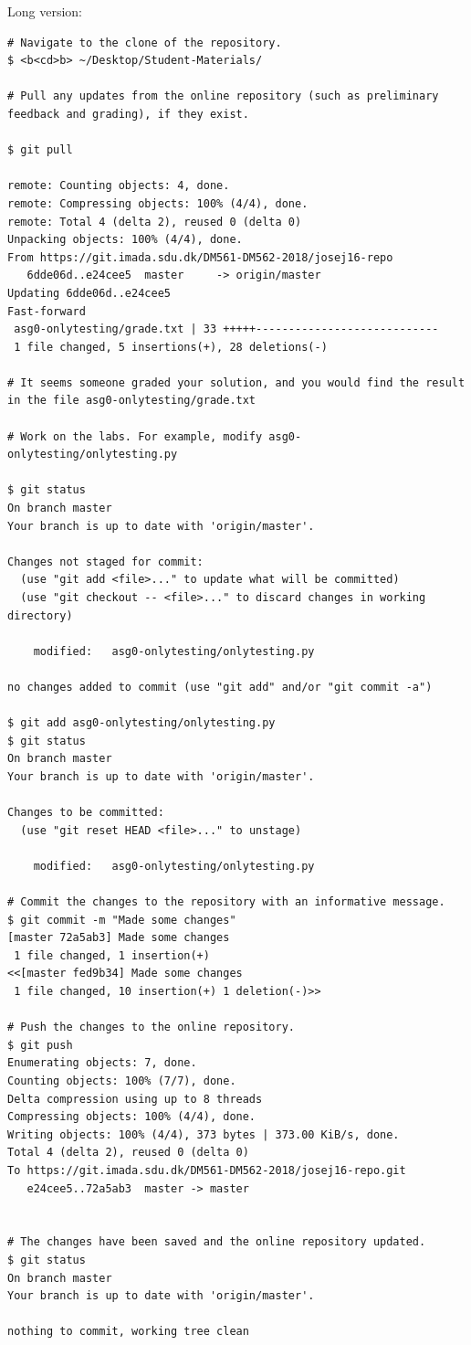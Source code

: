 Long version:
\begin{lstlisting}
# Navigate to the clone of the repository.
$ <b<cd>b> ~/Desktop/Student-Materials/

# Pull any updates from the online repository (such as preliminary feedback and grading), if they exist.

$ git pull

remote: Counting objects: 4, done.
remote: Compressing objects: 100% (4/4), done.
remote: Total 4 (delta 2), reused 0 (delta 0)
Unpacking objects: 100% (4/4), done.
From https://git.imada.sdu.dk/DM561-DM562-2018/josej16-repo
   6dde06d..e24cee5  master     -> origin/master
Updating 6dde06d..e24cee5
Fast-forward
 asg0-onlytesting/grade.txt | 33 +++++----------------------------
 1 file changed, 5 insertions(+), 28 deletions(-)

# It seems someone graded your solution, and you would find the result in the file asg0-onlytesting/grade.txt
 
# Work on the labs. For example, modify asg0-onlytesting/onlytesting.py

$ git status
On branch master
Your branch is up to date with 'origin/master'.

Changes not staged for commit:
  (use "git add <file>..." to update what will be committed)
  (use "git checkout -- <file>..." to discard changes in working directory)

	modified:   asg0-onlytesting/onlytesting.py

no changes added to commit (use "git add" and/or "git commit -a")

$ git add asg0-onlytesting/onlytesting.py
$ git status
On branch master
Your branch is up to date with 'origin/master'.

Changes to be committed:
  (use "git reset HEAD <file>..." to unstage)

	modified:   asg0-onlytesting/onlytesting.py

# Commit the changes to the repository with an informative message.
$ git commit -m "Made some changes"
[master 72a5ab3] Made some changes
 1 file changed, 1 insertion(+)
<<[master fed9b34] Made some changes
 1 file changed, 10 insertion(+) 1 deletion(-)>>

# Push the changes to the online repository.
$ git push
Enumerating objects: 7, done.
Counting objects: 100% (7/7), done.
Delta compression using up to 8 threads
Compressing objects: 100% (4/4), done.
Writing objects: 100% (4/4), 373 bytes | 373.00 KiB/s, done.
Total 4 (delta 2), reused 0 (delta 0)
To https://git.imada.sdu.dk/DM561-DM562-2018/josej16-repo.git
   e24cee5..72a5ab3  master -> master


# The changes have been saved and the online repository updated.
$ git status
On branch master
Your branch is up to date with 'origin/master'.

nothing to commit, working tree clean
\end{lstlisting}

